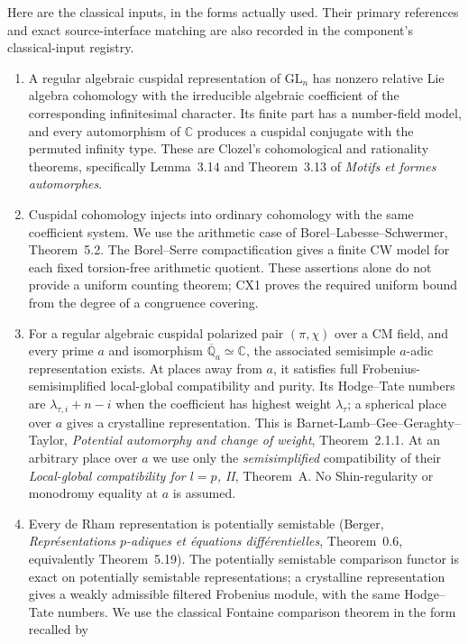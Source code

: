 Here are the classical inputs, in the forms actually used.  Their
primary references and exact source-interface matching are also
recorded in the component's classical-input registry.

\begin{enumerate}
\item A regular algebraic cuspidal representation of
$\mathrm{GL}_n$ has nonzero relative Lie algebra cohomology with
the irreducible algebraic coefficient of the corresponding
infinitesimal character.  Its finite part has a number-field
model, and every automorphism of $\mathbb C$ produces a cuspidal
conjugate with the permuted infinity type.  These are Clozel's
cohomological and rationality theorems, specifically Lemma~3.14
and Theorem~3.13 of \emph{Motifs et formes automorphes}.
\item Cuspidal cohomology injects into ordinary cohomology with
the same coefficient system.  We use the arithmetic case of
Borel--Labesse--Schwermer, Theorem~5.2.  The Borel--Serre
compactification gives a finite CW model for each fixed
torsion-free arithmetic quotient.  These assertions alone do not
provide a uniform counting theorem; CX1 proves the required
uniform bound from the degree of a congruence covering.
\item For a regular algebraic cuspidal polarized pair
$(\pi,\chi)$ over a CM field, and every prime $a$ and isomorphism
$\overline{\mathbb Q}_a\simeq\mathbb C$, the associated
semisimple $a$-adic representation exists.  At places away from
$a$, it satisfies full Frobenius-semisimplified local-global
compatibility and purity.  Its Hodge--Tate numbers are
$\lambda_{\tau,i}+n-i$ when the coefficient has highest weight
$\lambda_\tau$; a spherical place over $a$ gives a crystalline
representation.  This is Barnet-Lamb--Gee--Geraghty--Taylor,
\emph{Potential automorphy and change of weight},
Theorem~2.1.1.  At an arbitrary place over $a$ we use only the
\emph{semisimplified} compatibility of their
\emph{Local-global compatibility for $l=p$, II}, Theorem~A.
No Shin-regularity or monodromy equality at $a$ is assumed.
\item Every de Rham representation is potentially semistable
(Berger, \emph{Repr\'esentations $p$-adiques et \'equations
diff\'erentielles}, Theorem~0.6, equivalently Theorem~5.19).
The potentially semistable comparison functor is exact
on potentially semistable representations; a crystalline
representation gives a weakly admissible filtered Frobenius
module, with the same Hodge--Tate numbers.  We use the classical
Fontaine comparison theorem in the form recalled by

\end{enumerate}
